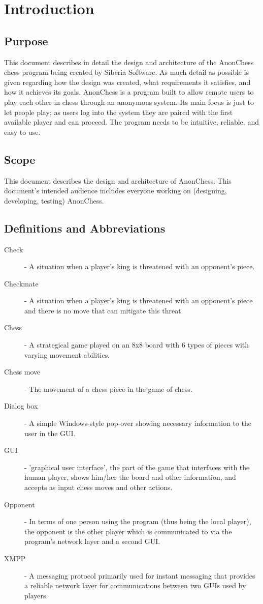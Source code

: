 \section{Introduction}

\subsection{Purpose}
This document describes in detail the design and architecture of the AnonChess chess program being created by Siberia Software. As much detail as possible is given regarding how the design was created, what requirements it satisfies, and how it achieves its goals.
AnonChess is a program built to allow remote users to play each other in chess through an anonymous system. Its main focus is just to let people play; as users log into the system they are paired with the first available player and can proceed. The program needs to be intuitive, reliable, and easy to use.

\subsection{Scope}
This document describes the design and architecture of AnonChess. This document's intended audience includes everyone working on (designing, developing, testing) AnonChess.
\subsection{Definitions and Abbreviations}
\begin{description}
\item[Check] - A situation when a player's king is threatened with an opponent's piece.
\item[Checkmate] - A situation when a player's king is threatened with an opponent's piece and there is no move that can mitigate this threat.
\item[Chess] - A strategical game played on an 8x8 board with 6 types of pieces with varying movement abilities.
\item[Chess move] - The movement of a chess piece in the game of chess.
\item[Dialog box] - A simple Windows-style pop-over showing necessary information to the user in the GUI.
\item[GUI] - 'graphical user interface', the part of the game that interfaces with the human player, shows him/her the board and other information, and accepts as input chess moves and other actions.
\item[Opponent] - In terms of one person using the program (thus being the local player), the opponent is the other player which is communicated to via the program's network layer and a second GUI.
\item[XMPP] - A messaging protocol primarily used for instant messaging that provides a reliable network layer for communications between two GUIs used by players.
\end{description}

